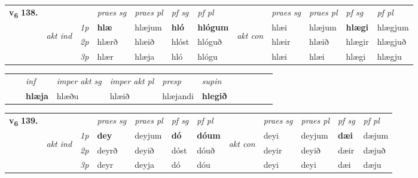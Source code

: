 \begin{tabular}{llllllllllll} \toprule
\multirow{4}{*}{{{\textbf{v{\textsubscript{6}}} \Large{\textbf{138.}}}}}  & &   &  \textit{praes sg}  & \textit{praes pl}  &\textit{ pf sg} & \textit{pf pl} &  &  \textit{praes sg}  & \textit{praes pl}  & \textit{pf sg} & \textit{pf pl } \\*
	\cmidrule{4-7} \cmidrule{9-12}
 & \multirow{3}{*}{\begin{turn}{90}\textit{akt ind}\end{turn}} & {\textit{1p}} & \textbf{hlæ} & hlæjum    & \textbf{hló} & \textbf{hlógum} & \multirow{3}{*}{\begin{turn}{90}\textit{akt con}\end{turn}} &hlæi & hlæjum & \textbf{hlægi} & hlægjum\\*
& &  {\textit{2p}} &  hlærð  & hlæið   & hlóst & hlóguð & & hlæir & hlæið & hlægir & hlægjuð \\*
& &  {\textit{3p}} & hlær & hlæja   & hló & hlógu & & hlæi & hlæi& hlægi & hlægju  \\*
\cmidrule{4-7} \cmidrule{9-12}
\end{tabular}


\begin{tabular}{llllllllllll}
 & & \textit{inf} & \textit{imper akt sg} & \textit{imper akt pl}   & \textit{presp} & \textit{supin}       \\*
  & & \textbf{hlæja} & hlæðu  & hlæið   & hlæjandi &  \textbf{hlegið}   \\*
\cmidrule{1-12}
\end{tabular}



\begin{tabular}{llllllllllll} \toprule
\multirow{4}{*}{{{\textbf{v{\textsubscript{6}}} \Large{\textbf{139.}}}}}  & &   &  \textit{praes sg}  & \textit{praes pl}  &\textit{ pf sg} & \textit{pf pl} &  &  \textit{praes sg}  & \textit{praes pl}  & \textit{pf sg} & \textit{pf pl } \\*
	\cmidrule{4-7} \cmidrule{9-12}
 & \multirow{3}{*}{\begin{turn}{90}\textit{akt ind}\end{turn}} & {\textit{1p}} & \textbf{dey} & deyjum    & \textbf{dó} & \textbf{dóum} & \multirow{3}{*}{\begin{turn}{90}\textit{akt con}\end{turn}} &deyi & deyjum & \textbf{dæi} & dæjum\\*
& &  {\textit{2p}} &  deyrð  & deyið   & dóst & dóuð & & deyir & deyið & dæir & dæjuð \\*
& &  {\textit{3p}} & deyr & deyja   & dó & dóu & & deyi & deyi& dæi & dæju  \\*
\cmidrule{4-7} \cmidrule{9-12}
\end{tabular}


